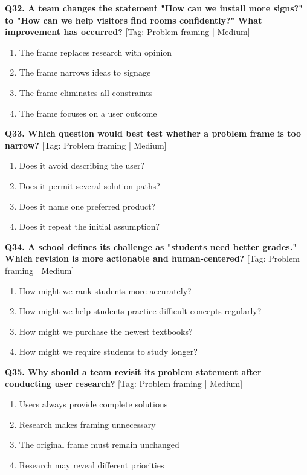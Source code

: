 \noindent\textbf{Q32. A team changes the statement "How can we install more signs?" to "How can we help visitors find rooms confidently?" What improvement has occurred?} \hfill [Tag: Problem framing | Medium]
\begin{enumerate}[label=(\alph*),topsep=2pt,itemsep=1pt,partopsep=0pt,parsep=0pt]
    \item {The frame replaces research with opinion}
    \item {The frame narrows ideas to signage}
    \item {The frame eliminates all constraints}
    \item {The frame focuses on a user outcome}
\end{enumerate}
\vspace{2mm}

\noindent\textbf{Q33. Which question would best test whether a problem frame is too narrow?} \hfill [Tag: Problem framing | Medium]
\begin{enumerate}[label=(\alph*),topsep=2pt,itemsep=1pt,partopsep=0pt,parsep=0pt]
    \item {Does it avoid describing the user?}
    \item {Does it permit several solution paths?}
    \item {Does it name one preferred product?}
    \item {Does it repeat the initial assumption?}
\end{enumerate}
\vspace{2mm}

\noindent\textbf{Q34. A school defines its challenge as "students need better grades." Which revision is more actionable and human-centered?} \hfill [Tag: Problem framing | Medium]
\begin{enumerate}[label=(\alph*),topsep=2pt,itemsep=1pt,partopsep=0pt,parsep=0pt]
    \item {How might we rank students more accurately?}
    \item {How might we help students practice difficult concepts regularly?}
    \item {How might we purchase the newest textbooks?}
    \item {How might we require students to study longer?}
\end{enumerate}
\vspace{2mm}

\noindent\textbf{Q35. Why should a team revisit its problem statement after conducting user research?} \hfill [Tag: Problem framing | Medium]
\begin{enumerate}[label=(\alph*),topsep=2pt,itemsep=1pt,partopsep=0pt,parsep=0pt]
    \item {Users always provide complete solutions}
    \item {Research makes framing unnecessary}
    \item {The original frame must remain unchanged}
    \item {Research may reveal different priorities}
\end{enumerate}
\vspace{2mm}

